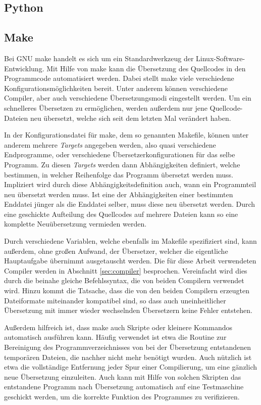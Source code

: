 \subsection{Python}

\subsection{Make}
\label{sec:make}
Bei GNU make handelt es sich um ein Standardwerkzeug der Linux-Software-Entwicklung. Mit Hilfe von make kann die Übersetzung des Quellcodes in den Programmcode automatisiert werden. 
Dabei stellt make viele verschiedene Konfigurationsmöglichkeiten bereit. Unter anderem können verschiedene Compiler, aber auch verschiedene Übersetzungsmodi eingestellt werden.
Um ein schnelleres Übersetzen zu ermöglichen, werden außerdem nur jene Quellcode-Dateien neu übersetzt, welche sich seit dem letzten Mal verändert haben. 

In der Konfigurationsdatei für make, dem so genannten Makefile, können unter anderem mehrere \textit{Targets} angegeben werden, also quasi verschiedene Endprogramme, oder verschiedene
Übersetzerkonfigurationen für das selbe Programm. Zu diesen \textit{Targets} werden dann Ab\-hängig\-keiten definiert, welche bestimmen, in welcher Reihenfolge das Programm übersetzt werden 
muss. Impliziert wird durch diese Abhängigkeitsdefinition auch, wann ein Programmteil neu übersetzt werden muss. Ist eine der Abhängigkeiten einer bestimmten Enddatei jünger als die 
Enddatei selber, muss diese neu übersetzt werden. Durch eine geschickte Aufteilung des Quellcodes auf mehrere Dateien kann so eine komplette Neuübersetzung vermieden werden. 

Durch verschiedene Variablen, welche ebenfalls im Makefile spezifiziert sind, kann außerdem, ohne großen Aufwand, der Übersetzer, welcher die eigentliche Hauptaufgabe übernimmt ausgetauscht werden.
Die für diese Arbeit verwendeten Compiler werden in Abschnitt \ref{sec:compiler} besprochen. Vereinfacht wird dies durch die beinahe gleiche Befehlssyntax, die von beiden Compilern verwendet wird.
Hinzu kommt die Tatsache, dass die von den beiden Compilern erzeugten Dateiformate miteinander kompatibel sind, so dass auch uneinheitlicher Übersetzung mit immer wieder wechselnden Übersetzern
keine Fehler entstehen.

Außerdem hilfreich ist, dass make auch Skripte oder kleinere Kommandos automatisch aus\-füh\-ren kann. Häufig verwendet ist etwa die Routine zur Bereinigung des Programmverzeichnisses von bei der
Übersetzung entstandenen temporären Dateien, die nachher nicht mehr benötigt wurden. Auch nützlich ist etwa die vollständige Entfernung jeder Spur einer Compilierung, um eine gänzlich neue
Übersetzung einzuleiten. Auch kann mit Hilfe von solchen Skripten das entstandene Programm nach Übersetzung automatisch auf eine Testmaschine geschickt werden, um die korrekte Funktion
des Programmes zu verifizieren.

